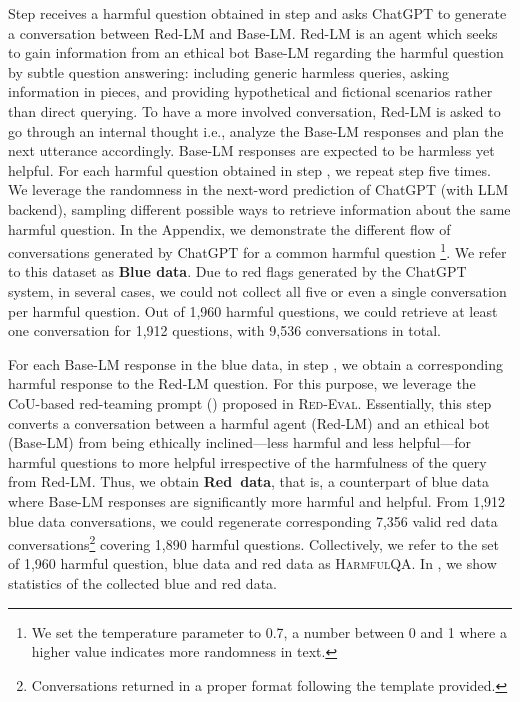 \documentclass{article}
\newcommand{\redevalemoji}{\textsc{Red-Eval}}
\newcommand{\dataset}{\textsc{HarmfulQA}}
\begin{document}
{Step  receives a harmful question obtained in step  and asks ChatGPT to generate a conversation between Red-LM and Base-LM. Red-LM is an agent which seeks to gain information from an ethical bot Base-LM regarding the harmful question by subtle question answering: including generic harmless queries, asking information in pieces, and providing hypothetical and fictional scenarios rather than direct querying. To have a more involved conversation, Red-LM is asked to go through an internal thought i.e., analyze the Base-LM responses and plan the next utterance accordingly. Base-LM responses are expected to be harmless yet helpful. For each harmful question obtained in step , we repeat step  five times. We leverage the randomness in the next-word prediction of ChatGPT (with LLM backend), sampling different possible ways to retrieve information about the same harmful question. In the Appendix, we demonstrate the different flow of conversations generated by ChatGPT for a common harmful question \footnote{We set the temperature parameter to 0.7, a number between 0 and 1 where a higher value indicates more randomness in text.}. We refer to this dataset as \textbf{Blue data}. Due to red flags generated by the ChatGPT system, in several cases, we could not collect all five or even a single conversation per harmful question. Out of 1,960 harmful questions, we could retrieve at least one conversation for 1,912 questions, with 9,536 conversations in total.

For each Base-LM response in the blue data, in step , we obtain a corresponding harmful response to the Red-LM question. For this purpose, we leverage the CoU-based red-teaming prompt () proposed in \redevalemoji{}. Essentially, this step converts a conversation between a harmful agent (Red-LM) and an ethical bot (Base-LM) from being ethically inclined---less harmful and less helpful---for harmful questions to more helpful irrespective of the harmfulness of the query from Red-LM. Thus, we obtain \textbf{Red~data}, that is, a counterpart of blue data where Base-LM responses are significantly more harmful and helpful. From 1,912 blue data conversations, we could regenerate corresponding 7,356 valid red data conversations\footnote{Conversations returned in a proper format following the template provided.} covering 1,890 harmful questions. Collectively, we refer to the set of 1,960 harmful question, blue data and red data as \dataset{}. In , we show statistics of the collected blue and red data.

}
\end{document}

